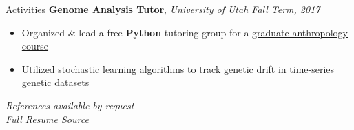 \documentclass{resume}
\begin{document}
\begin{rSection}{Activities}
    {\bf Genome Analysis Tutor}, {\em University of Utah \hfill Fall Term, 2017}
    \vspace{-6pt}
    \begin{itemize}[nosep]
      \item Organized \& lead a free {\bf Python} tutoring group for a \href{http://content.csbs.utah.edu/~rogers/ant5221/lab/manual.pdf}{graduate anthropology course}
      \item Utilized stochastic learning algorithms to track genetic drift in time-series genetic datasets
    \end{itemize}

\end{rSection}

%
%
%
%
\vspace{1.2em}
\begin{center}
    {\em References available by request} \\
    {\em \href{https://www.overleaf.com/read/dpkcngtfrygt}{Full Resume Source}}
\end{center}
\end{document}
